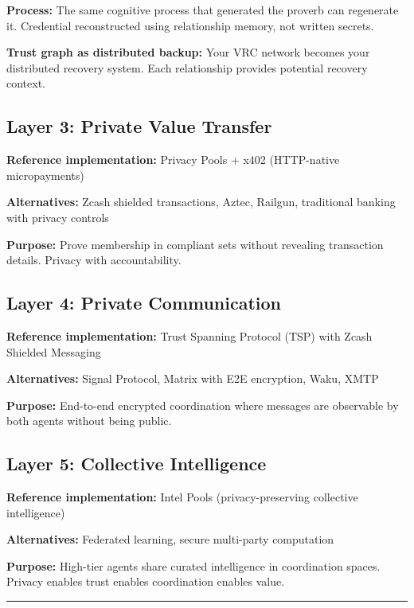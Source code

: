 \documentclass[
  11pt,
]{article}
\begin{document}
\textbf{Process:} The same cognitive process that generated the proverb
can regenerate it. Credential reconstructed using relationship memory,
not written secrets.

\textbf{Trust graph as distributed backup:} Your VRC network becomes
your distributed recovery system. Each relationship provides potential
recovery context.

\subsection{Layer 3: Private Value
Transfer}\label{layer-3-private-value-transfer}

\textbf{Reference implementation:} Privacy Pools + x402 (HTTP-native
micropayments)

\textbf{Alternatives:} Zcash shielded transactions, Aztec, Railgun,
traditional banking with privacy controls

\textbf{Purpose:} Prove membership in compliant sets without revealing
transaction details. Privacy with accountability.

\subsection{Layer 4: Private
Communication}\label{layer-4-private-communication}

\textbf{Reference implementation:} Trust Spanning Protocol (TSP) with
Zcash Shielded Messaging

\textbf{Alternatives:} Signal Protocol, Matrix with E2E encryption,
Waku, XMTP

\textbf{Purpose:} End-to-end encrypted coordination where messages are
observable by both agents without being public.

\subsection{Layer 5: Collective
Intelligence}\label{layer-5-collective-intelligence}

\textbf{Reference implementation:} Intel Pools (privacy-preserving
collective intelligence)

\textbf{Alternatives:} Federated learning, secure multi-party
computation

\textbf{Purpose:} High-tier agents share curated intelligence in
coordination spaces. Privacy enables trust enables coordination enables
value.

\begin{center}\rule{0.5\linewidth}{0.5pt}\end{center}
\end{document}
